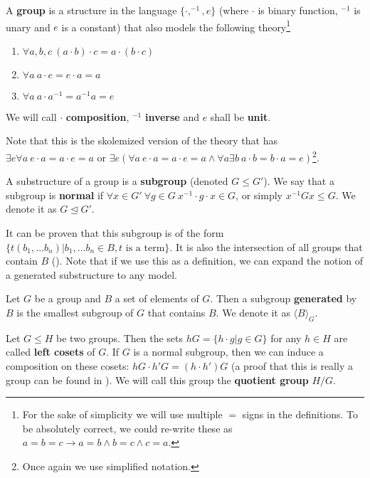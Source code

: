 \begin{defn}
A \textbf{group} is a structure in the language $\{\cdot,^{-1},e\}$ (where $\cdot$ is binary function, $^{-1}$ is unary and $e$ is a constant) that also models the following theory\footnote{For the sake of simplicity we will use multiple $=$ signs in the definitions. To be absolutely correct, we could re-write these as $a=b=c \longrightarrow a=b\wedge b=c \wedge c=a$.}
\begin{enumerate}
	\item $\forall a,b,c\ (a\cdot b)\cdot c = a \cdot (b\cdot c)$
	\item $\forall a\ a\cdot e = e\cdot a = a$
	\item $\forall a\ a\cdot a^{-1}=a^{-1}a=e$
\end{enumerate}
We will call $\cdot$ \textbf{composition}, $^{-1}$ \textbf{inverse} and $e$ shall be \textbf{unit}.
\end{defn}

Note that this is the skolemized version of the theory that has $\exists e \forall a\ e\cdot a = a\cdot e = a$ or $\exists e(\forall a\ e\cdot a = a\cdot e = a \wedge\forall a \exists b\ a\cdot b = b\cdot a = e)$\footnote{Once again we use simplified notation.}. 

\begin{defn}
	A substructure of a group is a \textbf{subgroup} (denoted $G\leq G'$). We say that a subgroup is \textbf{normal} if $\forall x\in G'\ \forall g\in G\ x^{-1}\cdot g\cdot x\in G$, or simply $x^{-1}Gx\leq G$. We denote it as $G\trianglelefteq G'$.
\end{defn}

It can be proven that this subgroup is of the form $\{t(b_1,\dots b_n)|b_1,\dots b_n\in B, t \text{ is a term}\}$. It is also the intersection of all groups that contain $B$ (\cite{group}). Note that if we use this as a definition, we can expand the notion of a generated substructure to any model.

\begin{defn}
	Let $G$ be a group and $B$ a set of elements of $G$. Then a subgroup \textbf{generated} by $B$ is the smallest subgroup of $G$ that contains $B$. We denote it as $\langle B\rangle_G$.
\end{defn}

\begin{defn}
	Let $G\leq H$ be two groups. Then the sets $hG=\{h\cdot g|g\in G\}$ for any $ h\in H$ are called  \textbf{left cosets} of $G$. If $G$ is a normal subgroup, then we can induce a composition on these cosets: $hG\cdot h'G=(h\cdot h')G$ (a proof that this is really a group can be found in \cite{group}). We will call this group the \textbf{quotient group} $H/G$.
\end{defn}

